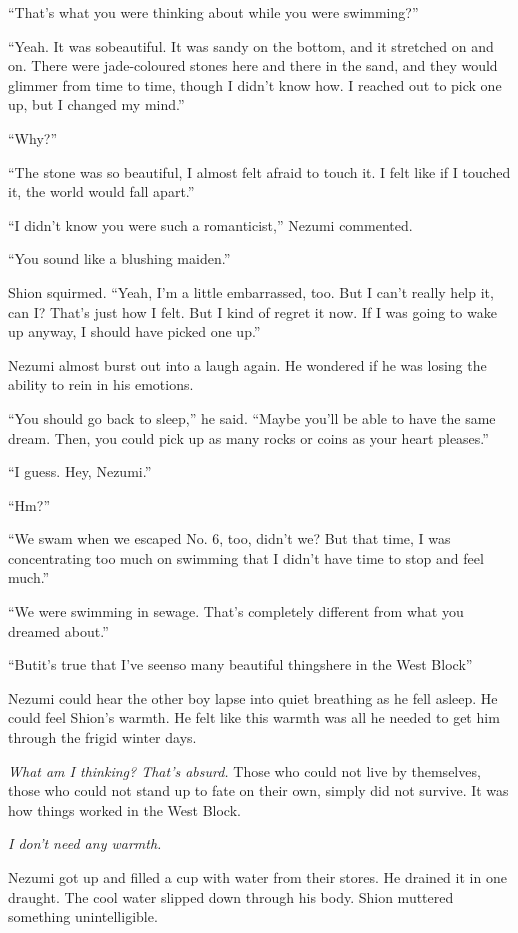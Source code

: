 ``That's what you were thinking about while you were swimming?''

``Yeah. It was so\el beautiful. It was sandy on the bottom, and it
stretched on and on. There were jade-coloured stones here and there in
the sand, and they would glimmer from time to time, though I didn't know
how. I reached out to pick one up, but I changed my mind.''

``Why?''

``The stone was so beautiful, I almost felt afraid to touch it. I felt
like if I touched it, the world would fall apart.''

``I didn't know you were such a romanticist,'' Nezumi commented.

``You sound like a blushing maiden.''

Shion squirmed. ``Yeah, I'm a little embarrassed, too. But I can't
really help it, can I? That's just how I felt. But I kind of regret it
now. If I was going to wake up anyway, I should have picked one up.''

Nezumi almost burst out into a laugh again. He wondered if he was losing
the ability to rein in his emotions.

``You should go back to sleep,'' he said. ``Maybe you'll be able to have
the same dream. Then, you could pick up as many rocks or coins as your
heart pleases.''

``I guess. Hey, Nezumi.''

``Hm?''

``We swam when we escaped No. 6, too, didn't we? But that time, I was
concentrating too much on swimming that I didn't have time to stop and
feel much.''

``We were swimming in sewage. That's completely different from what you
dreamed about.''

``But\el it's true that I've seen\el so many beautiful things\el here in
the West Block\el ''

Nezumi could hear the other boy lapse into quiet breathing as he fell
asleep. He could feel Shion's warmth. He felt like this warmth was all
he needed to get him through the frigid winter days.

\emph{What am I thinking? That's absurd.} Those who could not live by
themselves, those who could not stand up to fate on their own, simply
did not survive. It was how things worked in the West Block.

\emph{I don't need any warmth.}

Nezumi got up and filled a cup with water from their stores. He drained
it in one draught. The cool water slipped down through his body. Shion
muttered something unintelligible.


